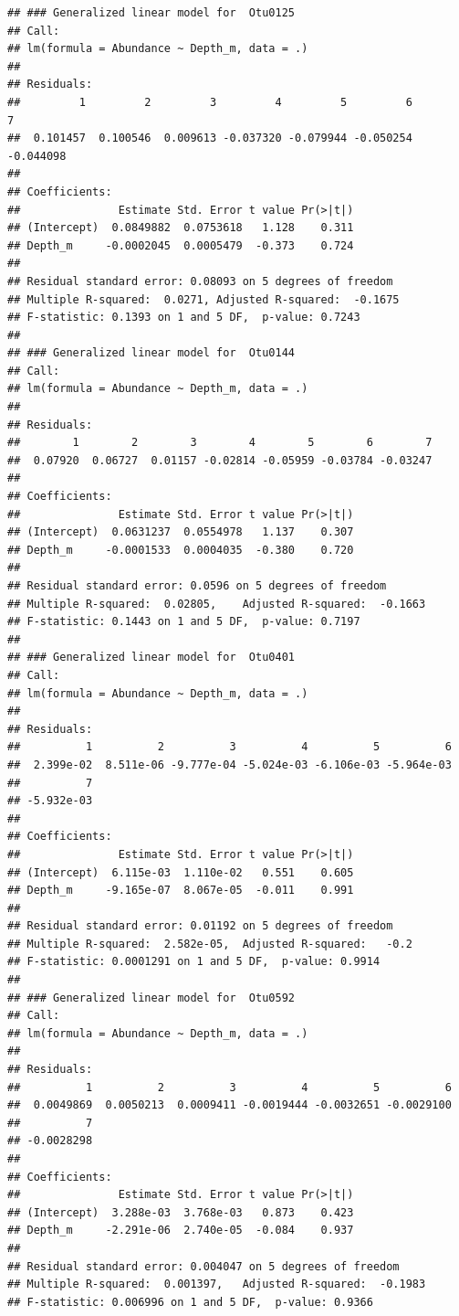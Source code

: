 \documentclass[11 pt,]{article}
\begin{document}
\begin{verbatim}
## ### Generalized linear model for  Otu0125
## Call:
## lm(formula = Abundance ~ Depth_m, data = .)
## 
## Residuals:
##         1         2         3         4         5         6         7 
##  0.101457  0.100546  0.009613 -0.037320 -0.079944 -0.050254 -0.044098 
## 
## Coefficients:
##               Estimate Std. Error t value Pr(>|t|)
## (Intercept)  0.0849882  0.0753618   1.128    0.311
## Depth_m     -0.0002045  0.0005479  -0.373    0.724
## 
## Residual standard error: 0.08093 on 5 degrees of freedom
## Multiple R-squared:  0.0271, Adjusted R-squared:  -0.1675 
## F-statistic: 0.1393 on 1 and 5 DF,  p-value: 0.7243
## 
## ### Generalized linear model for  Otu0144
## Call:
## lm(formula = Abundance ~ Depth_m, data = .)
## 
## Residuals:
##        1        2        3        4        5        6        7 
##  0.07920  0.06727  0.01157 -0.02814 -0.05959 -0.03784 -0.03247 
## 
## Coefficients:
##               Estimate Std. Error t value Pr(>|t|)
## (Intercept)  0.0631237  0.0554978   1.137    0.307
## Depth_m     -0.0001533  0.0004035  -0.380    0.720
## 
## Residual standard error: 0.0596 on 5 degrees of freedom
## Multiple R-squared:  0.02805,    Adjusted R-squared:  -0.1663 
## F-statistic: 0.1443 on 1 and 5 DF,  p-value: 0.7197
## 
## ### Generalized linear model for  Otu0401
## Call:
## lm(formula = Abundance ~ Depth_m, data = .)
## 
## Residuals:
##          1          2          3          4          5          6 
##  2.399e-02  8.511e-06 -9.777e-04 -5.024e-03 -6.106e-03 -5.964e-03 
##          7 
## -5.932e-03 
## 
## Coefficients:
##               Estimate Std. Error t value Pr(>|t|)
## (Intercept)  6.115e-03  1.110e-02   0.551    0.605
## Depth_m     -9.165e-07  8.067e-05  -0.011    0.991
## 
## Residual standard error: 0.01192 on 5 degrees of freedom
## Multiple R-squared:  2.582e-05,  Adjusted R-squared:   -0.2 
## F-statistic: 0.0001291 on 1 and 5 DF,  p-value: 0.9914
## 
## ### Generalized linear model for  Otu0592
## Call:
## lm(formula = Abundance ~ Depth_m, data = .)
## 
## Residuals:
##          1          2          3          4          5          6 
##  0.0049869  0.0050213  0.0009411 -0.0019444 -0.0032651 -0.0029100 
##          7 
## -0.0028298 
## 
## Coefficients:
##               Estimate Std. Error t value Pr(>|t|)
## (Intercept)  3.288e-03  3.768e-03   0.873    0.423
## Depth_m     -2.291e-06  2.740e-05  -0.084    0.937
## 
## Residual standard error: 0.004047 on 5 degrees of freedom
## Multiple R-squared:  0.001397,   Adjusted R-squared:  -0.1983 
## F-statistic: 0.006996 on 1 and 5 DF,  p-value: 0.9366
\end{verbatim}
\end{document}
